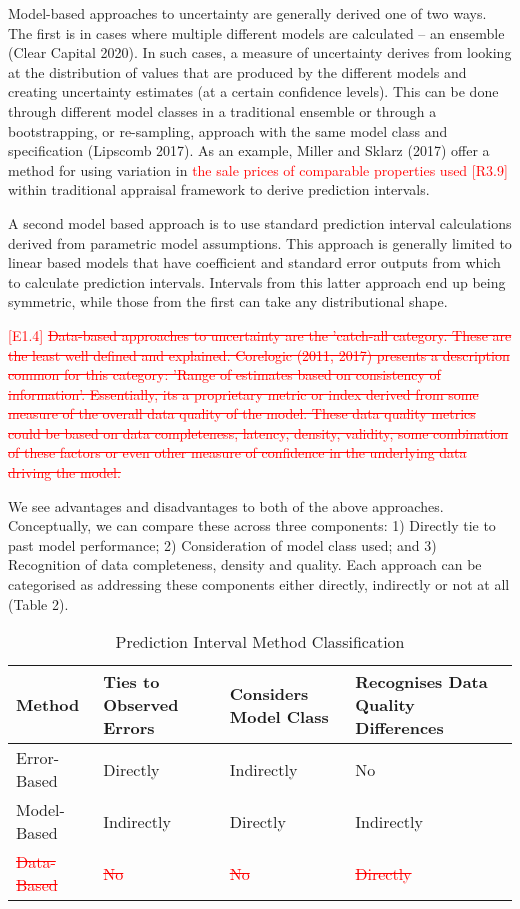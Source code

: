 \documentclass[colTwo]{anon}
\theoremstyle{definition}
\begin{document}
Model-based approaches to uncertainty are generally derived one of two ways.  The first is in cases where multiple different models are calculated -- an ensemble (Clear Capital 2020).  In such cases, a measure of uncertainty derives from looking at the distribution of values that are produced by the different models and creating uncertainty estimates (at a certain confidence levels). This can be done through different model classes in a traditional ensemble or through a bootstrapping, or re-sampling, approach with the same model class and specification (Lipscomb 2017).  As an example, Miller and Sklarz (2017) offer a method for using variation in \textcolor{red}{the sale prices of comparable properties used [R3.9]} within traditional appraisal framework to derive prediction intervals.  

A second model based approach is to use standard prediction interval calculations derived from parametric model assumptions.  This approach is generally limited to linear based models that have coefficient and standard error outputs from which to calculate prediction intervals.  Intervals from this latter approach end up being symmetric, while those from the first can take any distributional shape. 

\textcolor{red}{[E1.4] \st{Data-based approaches to uncertainty are the 'catch-all category.  These are the least well defined and explained.  Corelogic (2011, 2017) presents a description common for this category: 'Range of estimates based on consistency of information'.  Essentially, its a proprietary metric or index derived from some measure of the overall data quality of the model.  These data quality metrics could be based on data completeness, latency, density, validity, some combination of these factors or even other measure of confidence in the underlying data driving the model.}}  

We see advantages and disadvantages to both of the above approaches.   Conceptually, we can compare these across three components: 1) Directly tie to past model performance; 2) Consideration of model class used; and 3) Recognition of data completeness, density and quality.  Each approach can be categorised as addressing these components either directly, indirectly or not at all (Table 2).  

\begin{table}[h!]
\centering
\begin{tabular}{|p{1.2cm} | p{1.6cm} | p{1.6cm} | p{1.6cm} |} 
 \hline
  \textbf{Method} & \textbf{Ties to Observed Errors} & \textbf{Considers Model Class} & \textbf{Recognises Data Quality Differences} \\ [0.5ex] 
 \hline
 Error-Based & Directly & Indirectly & No \\ 
 \hline
 Model-Based & Indirectly & Directly & Indirectly \\
 \hline
 \textcolor{red}{\st{Data-Based}} & \textcolor{red}{\st{No}} & \textcolor{red}{\st{No}} & \textcolor{red}{\st{Directly}} \\
 \hline
\end{tabular}
\caption{Prediction Interval Method Classification}
\label{table:2}
\end{table}
\end{document}
